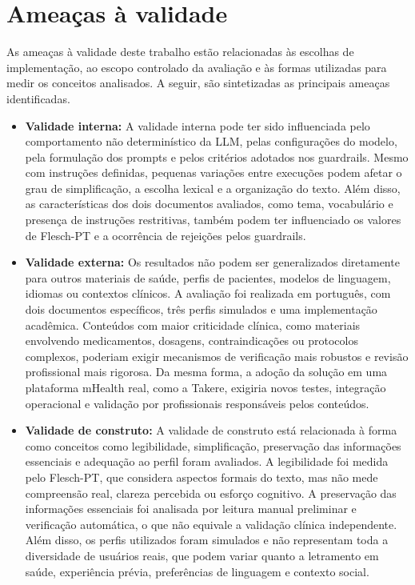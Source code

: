 \section{Ameaças à validade}

As ameaças à validade deste trabalho estão relacionadas às escolhas de implementação, ao escopo controlado da avaliação e às formas utilizadas para medir os conceitos analisados. A seguir, são sintetizadas as principais ameaças identificadas.

\begin{itemize}
    \item \textbf{Validade interna:} A validade interna pode ter sido influenciada pelo comportamento não determinístico da LLM, pelas configurações do modelo, pela formulação dos prompts e pelos critérios adotados nos guardrails. Mesmo com instruções definidas, pequenas variações entre execuções podem afetar o grau de simplificação, a escolha lexical e a organização do texto. Além disso, as características dos dois documentos avaliados, como tema, vocabulário e presença de instruções restritivas, também podem ter influenciado os valores de Flesch-PT e a ocorrência de rejeições pelos guardrails.
    
    \item \textbf{Validade externa:} Os resultados não podem ser generalizados diretamente para outros materiais de saúde, perfis de pacientes, modelos de linguagem, idiomas ou contextos clínicos. A avaliação foi realizada em português, com dois documentos específicos, três perfis simulados e uma implementação acadêmica. Conteúdos com maior criticidade clínica, como materiais envolvendo medicamentos, dosagens, contraindicações ou protocolos complexos, poderiam exigir mecanismos de verificação mais robustos e revisão profissional mais rigorosa. Da mesma forma, a adoção da solução em uma plataforma mHealth real, como a Takere, exigiria novos testes, integração operacional e validação por profissionais responsáveis pelos conteúdos.
    
    \item \textbf{Validade de construto:} A validade de construto está relacionada à forma como conceitos como legibilidade, simplificação, preservação das informações essenciais e adequação ao perfil foram avaliados. A legibilidade foi medida pelo Flesch-PT, que considera aspectos formais do texto, mas não mede compreensão real, clareza percebida ou esforço cognitivo. A preservação das informações essenciais foi analisada por leitura manual preliminar e verificação automática, o que não equivale a validação clínica independente. Além disso, os perfis utilizados foram simulados e não representam toda a diversidade de usuários reais, que podem variar quanto a letramento em saúde, experiência prévia, preferências de linguagem e contexto social.
\end{itemize}

